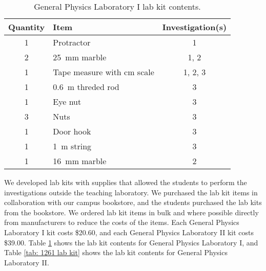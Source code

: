 \documentclass[aip, numerical, preprint]{revtex4-2}
\begin{document}
\begin{table}
  \caption{\label{tab: 1251 lab kit} General Physics Laboratory I lab kit contents.}
  \begin{tabular}{clc}
    \hline\hline
    Quantity & Item & Investigation(s)\\
    \hline
    1 & Protractor & 1 \\
    2 & \SI{25}{mm} marble & 1, 2 \\
    1 & Tape measure with cm scale & 1, 2, 3\\
    1 & \SI{0.6}{m} threded rod & 3 \\
    1 & Eye nut & 3 \\
    3 & Nuts & 3 \\
    1 & Door hook & 3 \\
    1 & \SI{1}{m} string & 3 \\
    1 & \SI{16}{mm} marble & 2 \\
    \hline\hline
  \end{tabular}
\end{table}

We developed lab kits with supplies that allowed the students to perform the investigations
outside the teaching laboratory. We purchased the lab kit items in collaboration with our
campus bookstore, and the students purchased the lab kits from the bookstore. We ordered lab
kit items in bulk and where possible directly from manufacturers to reduce the costs of the
items. Each General Physics Laboratory I kit costs \$20.60, and each
General Physics Laboratory II kit costs \$39.00. Table \ref{tab: 1251 lab kit} shows the lab
kit contents for General Physics Laboratory I, and Table \ref{tab: 1261 lab kit} shows the lab
kit contents for General Physics Laboratory II.
\end{document}
